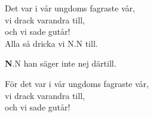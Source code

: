 \vspace{10pt}
Det var i vår ungdoms fagraste vår,\\
vi drack varandra till,\\
och vi sade gutår!\\
Alla så dricka vi N.N till.\par
\vspace{10pt}
{\textbf N.N han säger inte nej därtill.}\par
\vspace{10pt}
För det var i vår ungdoms fagraste vår,\\
vi drack varandra till,\\
och vi sade gutår!
